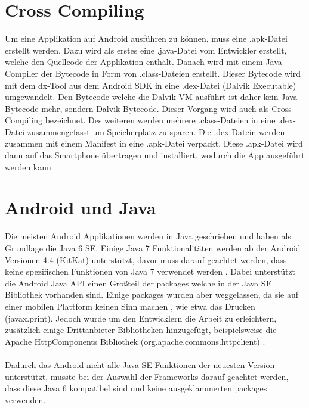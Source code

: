 \section{Cross Compiling}
Um eine Applikation auf Android ausführen zu können, muss eine .apk-Datei erstellt werden. Dazu wird als erstes eine .java-Datei vom Entwickler erstellt, welche den Quellcode der Applikation enthält. Danach wird mit einem Java-Compiler der Bytecode in Form von .class-Dateien erstellt. Dieser Bytecode wird mit dem dx-Tool aus dem Android SDK in eine .dex-Datei (Dalvik Executable) umgewandelt. Den Bytecode welche die Dalvik VM ausführt ist daher kein Java-Bytecode mehr, sondern Dalvik-Bytecode. Dieser Vorgang wird auch als Cross Compiling bezeichnet. Des weiteren werden mehrere .class-Dateien in eine .dex-Datei zusammengefasst um Speicherplatz zu sparen. Die .dex-Datein werden zusammen mit einem Manifest in eine .apk-Datei verpackt. Diese .apk-Datei wird dann auf das Smartphone übertragen und installiert, wodurch die App ausgeführt werden kann \cite{unterschied:dirscherl}.	

\section{Android und Java}
Die meisten Android Applikationen werden in Java geschrieben und haben als Grundlage die Java 6 \acrfull{SE}. Einige Java 7 Funktionalitäten werden ab der Android Versionen 4.4 (KitKat) unterstützt, davor muss darauf geachtet werden, dass keine spezifischen Funktionen von Java 7 verwendet werden \cite{android:burnette}. Dabei unterstützt die Android Java \acrfull{API} einen Großteil der packages welche in der Java SE Bibliothek vorhanden sind. Einige packages wurden aber weggelassen, da sie auf einer mobilen Plattform keinen Sinn machen \cite{implemenationSDK}, wie etwa das Drucken (javax.print). Jedoch wurde um den Entwicklern die Arbeit zu erleichtern, zusätzlich einige Drittanbieter Bibliotheken hinzugefügt, beispielsweise die Apache HttpComponents Bibliothek (org.apache.commons.httpclient) \cite{android:libs}. 
\\\\	
Dadurch das Android nicht alle Java SE Funktionen der neuesten Version unterstützt, musste bei der Auswahl der Frameworks darauf geachtet werden, dass diese Java 6 kompatibel sind und keine ausgeklammerten packages verwenden.	

